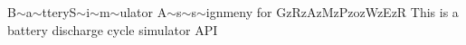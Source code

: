 B$\sim$a$\sim$ttery\+S$\sim$i$\sim$m$\sim$ulator A$\sim$s$\sim$s$\sim$ignmeny for Gz\+Rz\+Az\+Mz\+Pzoz\+Wz\+Ez\+R This is a battery discharge cycle simulator A\+P\+I 